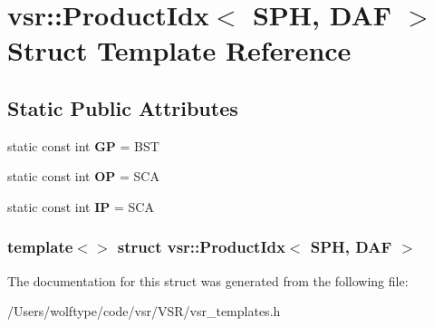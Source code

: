\hypertarget{structvsr_1_1_product_idx_3_01_s_p_h_00_01_d_a_f_01_4}{\section{vsr\-:\-:Product\-Idx$<$ S\-P\-H, D\-A\-F $>$ Struct Template Reference}
\label{structvsr_1_1_product_idx_3_01_s_p_h_00_01_d_a_f_01_4}
}
\subsection*{Static Public Attributes}
\begin{DoxyCompactItemize}
\item 
\hypertarget{structvsr_1_1_product_idx_3_01_s_p_h_00_01_d_a_f_01_4_ae7b977c357faf000580f7984bcbfa2ed}{static const int {\bfseries G\-P} = B\-S\-T}\label{structvsr_1_1_product_idx_3_01_s_p_h_00_01_d_a_f_01_4_ae7b977c357faf000580f7984bcbfa2ed}

\item 
\hypertarget{structvsr_1_1_product_idx_3_01_s_p_h_00_01_d_a_f_01_4_a6865f939b4e60a207229cedd2160c947}{static const int {\bfseries O\-P} = S\-C\-A}\label{structvsr_1_1_product_idx_3_01_s_p_h_00_01_d_a_f_01_4_a6865f939b4e60a207229cedd2160c947}

\item 
\hypertarget{structvsr_1_1_product_idx_3_01_s_p_h_00_01_d_a_f_01_4_a090eef68cf2742b142674738003a8591}{static const int {\bfseries I\-P} = S\-C\-A}\label{structvsr_1_1_product_idx_3_01_s_p_h_00_01_d_a_f_01_4_a090eef68cf2742b142674738003a8591}

\end{DoxyCompactItemize}
\subsubsection*{template$<$$>$ struct vsr\-::\-Product\-Idx$<$ S\-P\-H, D\-A\-F $>$}



The documentation for this struct was generated from the following file\-:\begin{DoxyCompactItemize}
\item 
/\-Users/wolftype/code/vsr/\-V\-S\-R/vsr\-\_\-templates.\-h\end{DoxyCompactItemize}
